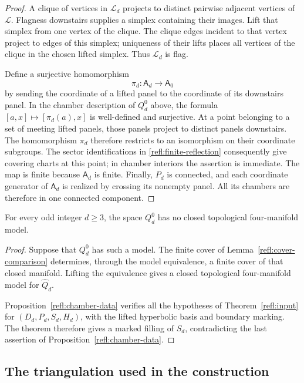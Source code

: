 \begin{proof}
A clique of vertices in $\mathcal L_d$ projects to distinct pairwise
adjacent vertices of $\mathcal L$.  Flagness downstairs supplies a
simplex containing their images.  Lift that simplex from one vertex
of the clique.  The clique edges incident to that vertex project to
edges of this simplex; uniqueness of their lifts places all vertices
of the clique in the chosen lifted simplex.  Thus
$\mathcal L_d$ is flag.

Define a surjective homomorphism
\[
 \pi_d\colon \mathsf A_d\longrightarrow\mathsf A_0
\]
by sending the coordinate of a lifted panel to the coordinate of its
downstairs panel.  In the chamber description of $Q^0_d$ above, the
formula $[a,x]\mapsto[\pi_d(a),x]$ is well-defined and surjective.
At a point belonging to a set of meeting lifted panels, those panels
project to distinct panels downstairs.  The homomorphism $\pi_d$
therefore restricts to an isomorphism on their coordinate subgroups.
The sector identifications in \eqref{refl:finite-reflection} consequently
give covering charts at this point; in chamber interiors the assertion
is immediate.  The map is finite because $\mathsf A_d$ is finite.  Finally,
$P_d$ is connected, and each coordinate generator of $\mathsf A_d$ is realized
by crossing its nonempty panel.  All its chambers are therefore in
one connected component.
\end{proof}

\begin{proposition}\label{refl:odd-models}
For every odd integer $d\geq3$, the space $Q^0_d$ has no closed
topological four-manifold model.
\end{proposition}

\begin{proof}
Suppose that $Q^0_d$ has such a model.  The finite cover of
Lemma~\ref{refl:cover-comparison} determines, through the model
equivalence, a finite cover of that closed manifold.  Lifting the
equivalence gives a closed topological four-manifold model for
$\widehat Q_d$.

Proposition~\ref{refl:chamber-data} verifies all the hypotheses of
Theorem~\ref{refl:input} for $(D_d,P_d,S_d,H_d)$, with the lifted
hyperbolic basis and boundary marking.  The theorem therefore gives a
marked filling of $S_d$, contradicting the last assertion of
Proposition~\ref{refl:chamber-data}.
\end{proof}

\subsection{The triangulation used in the construction}

